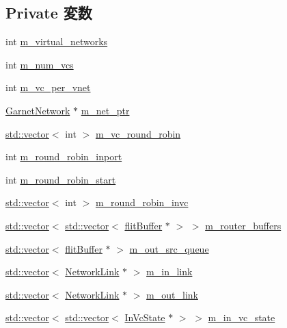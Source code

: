 \subsection*{Private 変数}
\begin{DoxyCompactItemize}
\item 
int \hyperlink{classRouter_af4cc96182e80059859793d92cb3dd769}{m\_\-virtual\_\-networks}
\item 
int \hyperlink{classRouter_a2e1a9213321dfa0386cdedaf6fc22996}{m\_\-num\_\-vcs}
\item 
int \hyperlink{classRouter_a2d66b8cad5144408ed492eeff4d37c2f}{m\_\-vc\_\-per\_\-vnet}
\item 
\hyperlink{classGarnetNetwork}{GarnetNetwork} $\ast$ \hyperlink{classRouter_a6f69c0ff922be798fa1cfce69f83244e}{m\_\-net\_\-ptr}
\item 
\hyperlink{classstd_1_1vector}{std::vector}$<$ int $>$ \hyperlink{classRouter_aac15a2e45cd3199aa6645027c3c49f29}{m\_\-vc\_\-round\_\-robin}
\item 
int \hyperlink{classRouter_a0c263ebf781383b8d6c95870cfaf076d}{m\_\-round\_\-robin\_\-inport}
\item 
int \hyperlink{classRouter_af4ca19e1a3ce236185490cf7e67f86d3}{m\_\-round\_\-robin\_\-start}
\item 
\hyperlink{classstd_1_1vector}{std::vector}$<$ int $>$ \hyperlink{classRouter_a0445a5ec24b4ba3c94bfaac14bdff561}{m\_\-round\_\-robin\_\-invc}
\item 
\hyperlink{classstd_1_1vector}{std::vector}$<$ \hyperlink{classstd_1_1vector}{std::vector}$<$ \hyperlink{classflitBuffer}{flitBuffer} $\ast$ $>$ $>$ \hyperlink{classRouter_acb8a77bcc0e2cbc61f9b60cfa443acf0}{m\_\-router\_\-buffers}
\item 
\hyperlink{classstd_1_1vector}{std::vector}$<$ \hyperlink{classflitBuffer}{flitBuffer} $\ast$ $>$ \hyperlink{classRouter_a1022c5b57cefcbc48cc2b28e5b15f12e}{m\_\-out\_\-src\_\-queue}
\item 
\hyperlink{classstd_1_1vector}{std::vector}$<$ \hyperlink{classNetworkLink}{NetworkLink} $\ast$ $>$ \hyperlink{classRouter_a4ff3f0c2e50626b517ea98c165c9a0c3}{m\_\-in\_\-link}
\item 
\hyperlink{classstd_1_1vector}{std::vector}$<$ \hyperlink{classNetworkLink}{NetworkLink} $\ast$ $>$ \hyperlink{classRouter_a2c9a37a8e348b31100b016ef9b51b235}{m\_\-out\_\-link}
\item 
\hyperlink{classstd_1_1vector}{std::vector}$<$ \hyperlink{classstd_1_1vector}{std::vector}$<$ \hyperlink{classInVcState}{InVcState} $\ast$ $>$ $>$ \hyperlink{classRouter_a9d8dfe7ed8a1027af42c383e180b8023}{m\_\-in\_\-vc\_\-state}

\end{DoxyCompactItemize}
